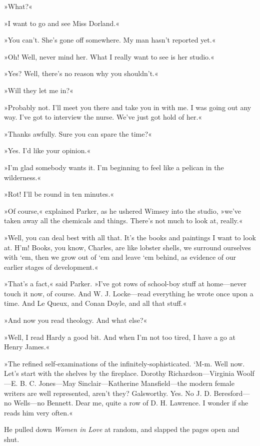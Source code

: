 »What?«

»I want to go and see Miss Dorland.«

»You can't. She's gone off somewhere. My man hasn't reported yet.«

»Oh! Well, never mind her. What I really want to see is her studio.«

»Yes? Well, there's no reason why you shouldn't.«

»Will they let me in?«

»Probably not. I'll meet you there and take you in with me. I was going out any way. I've got to interview the nurse. We've just got hold of her.«

»Thanks awfully. Sure you can spare the time?«

»Yes. I'd like your opinion.«

»I'm glad somebody wants it. I'm beginning to feel like a pelican in the wilderness.«

»Rot! I'll be round in ten minutes.«

»Of course,« explained Parker, as he ushered Wimsey into the studio, »we've taken away all the chemicals and things. There's not much to look at, really.«

»Well, you can deal best with all that. It's the books and paintings I want to look at. H'm! Books, you know, Charles, are like lobster shells, we surround ourselves with `em, then we grow out of `em and leave `em behind, as evidence of our earlier stages of development.«

»That's a fact,« said Parker. »I've got rows of school-boy stuff at home—never touch it now, of course. And W. J. Locke—read everything he wrote once upon a time. And Le Queux, and Conan Doyle, and all that stuff.«

»And now you read theology. And what else?«

»Well, I read Hardy a good bit. And when I'm not too tired, I have a go at Henry James.«

»The refined self-examinations of the infinitely-sophisticated. `M-m. Well now. Let's start with the shelves by the fireplace. Dorothy Richardson—Virginia Woolf—E. B. C. Jones—May Sinclair—Katherine Mansfield—the modern female writers are well represented, aren't they? Galsworthy. Yes. No J. D. Beresford—no Wells—no Bennett. Dear me, quite a row of D. H. Lawrence. I wonder if she reads him very often.«

He pulled down \textit{Women in Love} at random, and slapped the pages open and shut.

